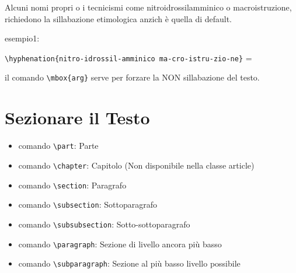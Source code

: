 \documentclass{report}
\begin{document}
            Alcuni nomi propri o i tecnicismi come nitroidrossilamminico o macroistruzione, richiedono la sillabazione etimologica anzich è quella di default.
            
            esempio1:
                \begin{center}
                    \verb!\hyphenation{nitro-idrossil-amminico ma-cro-istru-zio-ne}! = 
                \end{center}
            
            il comando \verb!\mbox{arg}! serve per forzare la NON sillabazione del testo.
        
        \section{Sezionare il Testo}
            \begin{itemize}
                \item comando \verb!\part!: Parte
                \item comando \verb!\chapter!: Capitolo (Non disponibile nella classe article)
                \item comando \verb!\section!: Paragrafo
                \item comando \verb!\subsection!: Sottoparagrafo
                \item comando \verb!\subsubsection!: Sotto-sottoparagrafo
                \item comando \verb!\paragraph!: Sezione di livello ancora più basso
                \item comando \verb!\subparagraph!: Sezione al più basso livello possibile
            \end{itemize}
\end{document}

